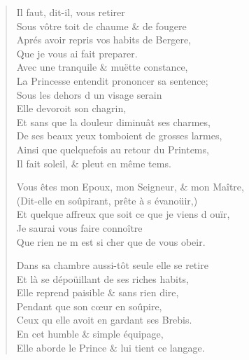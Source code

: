 \begin{verse}
\vin Il faut, dit-il, vous retirer \\
\vin Sous vôtre toit de chaume \& de fougere \\
Aprés avoir repris vos habits de Bergere, \\
\vin Que je vous ai fait preparer. \\
Avec une tranquile \& muëtte constance, \\
La Princesse entendit prononcer sa sentence; \\
\vin Sous les dehors d\textquotesingle{} un visage serain \\
\vin Elle devoroit son chagrin, \\
Et sans que la douleur diminuât ses charmes, \\
\vin De ses beaux yeux tomboient de grosses larmes, \\
Ainsi que quelquefois au retour du Printems, \\
\vin Il fait soleil, \& pleut en même tems.

Vous êtes mon Epoux, mon Seigneur, \& mon Maître, \\
(Dit-elle en soûpirant, prête à s\textquotesingle{} évanoüir,) \\
Et quelque affreux que soit ce que je viens d\textquotesingle{} ouïr, \\
\vin Je saurai vous faire connoître \\
Que rien ne m\textquotesingle{} est si cher que de vous obeir.

Dans sa chambre aussi-tôt seule elle se retire \\
Et là se dépoüillant de ses riches habits, \\
\vin Elle reprend paisible \& sans rien dire, \\
\vin Pendant que son cœur en soûpire, \\
\vin Ceux qu\textquotesingle{} elle avoit en gardant ses Brebis. \\
\vin En cet humble \& simple équipage, \\
Elle aborde le Prince \& lui tient ce langage.


\end{verse}
